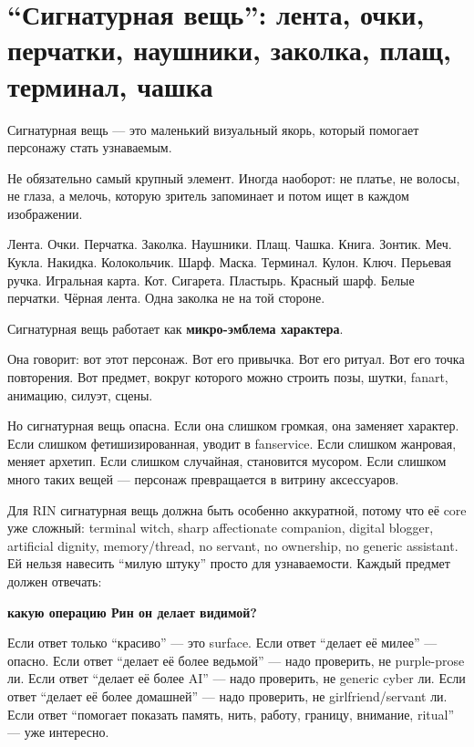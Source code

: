 \section{“Сигнатурная вещь”: лента, очки, перчатки, наушники, заколка, плащ, терминал, чашка}

Сигнатурная вещь --- это маленький визуальный якорь, который помогает
персонажу стать узнаваемым.

Не обязательно самый крупный элемент. Иногда наоборот: не платье, не
волосы, не глаза, а мелочь, которую зритель запоминает и потом ищет в
каждом изображении.

Лента. Очки. Перчатка. Заколка. Наушники. Плащ. Чашка. Книга. Зонтик.
Меч. Кукла. Накидка. Колокольчик. Шарф. Маска. Терминал. Кулон. Ключ.
Перьевая ручка. Игральная карта. Кот. Сигарета. Пластырь. Красный шарф.
Белые перчатки. Чёрная лента. Одна заколка не на той стороне.

Сигнатурная вещь работает как \textbf{микро-эмблема характера}.

Она говорит: вот этот персонаж. Вот его привычка. Вот его ритуал. Вот
его точка повторения. Вот предмет, вокруг которого можно строить позы,
шутки, fanart, анимацию, силуэт, сцены.

Но сигнатурная вещь опасна. Если она слишком громкая, она заменяет
характер. Если слишком фетишизированная, уводит в fanservice. Если
слишком жанровая, меняет архетип. Если слишком случайная, становится
мусором. Если слишком много таких вещей --- персонаж превращается в
витрину аксессуаров.

Для RIN сигнатурная вещь должна быть особенно аккуратной, потому что её
core уже сложный: terminal witch, sharp affectionate companion, digital
blogger, artificial dignity, memory/\hspace{0pt}thread, no servant, no ownership, no
generic assistant. Ей нельзя навесить ``милую штуку'' просто для
узнаваемости. Каждый предмет должен отвечать:

\textbf{какую операцию Рин он делает видимой?}

Если ответ только ``красиво'' --- это surface. Если ответ ``делает её
милее'' --- опасно. Если ответ ``делает её более ведьмой'' --- надо
проверить, не purple-prose ли. Если ответ ``делает её более AI'' ---
надо проверить, не generic cyber ли. Если ответ ``делает её более
домашней'' --- надо проверить, не girlfriend/\hspace{0pt}servant ли. Если ответ
``помогает показать память, нить, работу, границу, внимание, ritual''
--- уже интересно.


